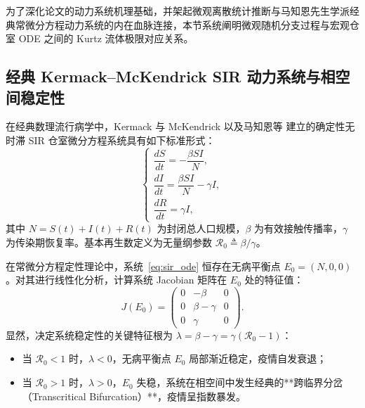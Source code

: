 为了深化论文的动力系统机理基础，并架起微观离散统计推断与马知恩先生学派经典常微分方程动力系统的内在血脉连接，本节系统阐明微观随机分支过程与宏观仓室 ODE 之间的 Kurtz 流体极限对应关系。

\subsection{经典 Kermack--McKendrick SIR 动力系统与相空间稳定性}
在经典数理流行病学中，Kermack 与 McKendrick \citep{kermack1927contribution} 以及马知恩等 \citep{ma2001stability,ma2004epidemic} 建立的确定性无时滞 SIR 仓室微分方程系统具有如下标准形式：
\begin{equation}
\begin{cases}
\dfrac{dS}{dt} = -\dfrac{\beta S I}{N}, \\[2ex]
\dfrac{dI}{dt} = \dfrac{\beta S I}{N} - \gamma I, \\[2ex]
\dfrac{dR}{dt} = \gamma I,
\end{cases} \label{eq:sir_ode}
\end{equation}
其中 $N = S(t) + I(t) + R(t)$ 为封闭总人口规模，$\beta$ 为有效接触传播率，$\gamma$ 为传染期恢复率。基本再生数定义为无量纲参数 $\mathcal{R}_0 \triangleq \beta / \gamma$。

在常微分方程定性理论中，系统~\eqref{eq:sir_ode} 恒存在无病平衡点 $E_0 = (N, 0, 0)$。对其进行线性化分析，计算系统 Jacobian 矩阵在 $E_0$ 处的特征值：
\begin{equation}
J(E_0) = \begin{pmatrix}
0 & -\beta & 0 \\
0 & \beta - \gamma & 0 \\
0 & \gamma & 0
\end{pmatrix}.
\end{equation}
显然，决定系统稳定性的关键特征根为 $\lambda = \beta - \gamma = \gamma(\mathcal{R}_0 - 1)$：
\begin{itemize}
    \item 当 $\mathcal{R}_0 < 1$ 时，$\lambda < 0$，无病平衡点 $E_0$ 局部渐近稳定，疫情自发衰退；
    \item 当 $\mathcal{R}_0 > 1$ 时，$\lambda > 0$，$E_0$ 失稳，系统在相空间中发生经典的**跨临界分岔（Transcritical Bifurcation）**，疫情呈指数暴发。
\end{itemize}

